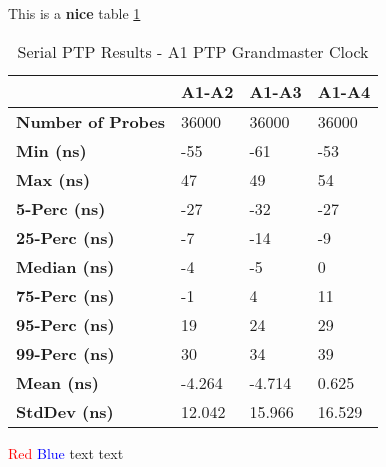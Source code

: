 This is a \textbf{nice} table \ref{table:ptp_serial_results}

\begin{table}[h]
	\centering
	\begin{tabular}{|p{5cm}|p{3cm}|p{3cm}|p{3cm}|}
		\hline
		\textbf{} & \textbf{A1-A2} & \textbf{A1-A3} & \textbf{A1-A4}\\ 
		\hline
		\textbf{Number of Probes} & 36000 & 36000 & 36000\\ 
		\hline
		\textbf{Min (ns)} & -55 & -61 & -53 \\ 
		\hline
		\textbf{Max (ns)} & 47 & 49 & 54 \\ 
		\hline
		\textbf{5-Perc (ns)} & -27 & -32 & -27 \\ 
		\hline
		\textbf{25-Perc (ns)} & -7 & -14 & -9 \\ 
		\hline
		\textbf{Median (ns)} & -4& -5 & 0 \\ 
		\hline
		\textbf{75-Perc (ns)} & -1 & 4 & 11 \\ 
		\hline
		\textbf{95-Perc (ns)} & 19 & 24 & 29 \\ 
		\hline
		\textbf{99-Perc (ns)} & 30 & 34 & 39 \\ 
		\hline
		\textbf{Mean (ns)} & -4.264 & -4.714 & 0.625 \\ 
		\hline
		\textbf{StdDev (ns)} & 12.042 & 15.966 & 16.529\\ 
		\hline
		\end{tabular}
		\caption{Serial PTP Results - A1 PTP Grandmaster Clock}
		\label{table:ptp_serial_results}
		\end{table}

\textcolor{red}{Red}
\textcolor{blue}{Blue}
\color{green}text
\color{black}text